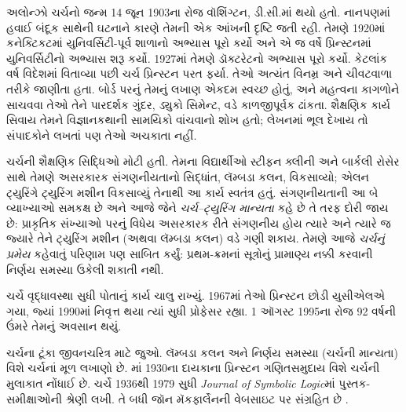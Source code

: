 \begingroup
\makeatletter{}\makeatother


\label{guunit:OLP-0623}



અલોન્ઝો ચર્ચનો જન્મ 14 જૂન 1903ના રોજ
વૉશિંગ્ટન, ડી.સી.માં થયો હતો. નાનપણમાં
હવાઈ બંદૂક સાથેની ઘટનાને કારણે તેમની
એક આંખની દૃષ્ટિ જતી રહી. તેમણે 1920માં
કનેક્ટિકટમાં યુનિવર્સિટી-પૂર્વ શાળાનો અભ્યાસ પૂરો
કર્યો અને એ જ વર્ષે પ્રિન્સ્ટનમાં
યુનિવર્સિટીનો અભ્યાસ શરૂ કર્યો. 1927માં
તેમણે ડૉક્ટરેટનો અભ્યાસ પૂરો કર્યો.
કેટલાંક વર્ષ વિદેશમાં વિતાવ્યા પછી ચર્ચ
પ્રિન્સ્ટન પરત ફર્યા. તેઓ અત્યંત વિનમ્ર
અને ચીવટવાળા તરીકે જાણીતા હતા. બોર્ડ
પરનું તેમનું લખાણ એકદમ સ્વચ્છ હોતું,
અને મહત્વના કાગળોને સાચવવા તેઓ તેને
પારદર્શક ગુંદર, ડ્યુકો સિમેન્ટ, વડે
કાળજીપૂર્વક ઢાંકતા. શૈક્ષણિક કાર્ય
સિવાય તેમને વિજ્ઞાનકથાની સામયિકો
વાંચવાનો શોખ હતો; લેખનમાં ભૂલ દેખાય
તો સંપાદકોને લખતાં પણ તેઓ અચકાતા નહીં.

ચર્ચની શૈક્ષણિક સિદ્ધિઓ મોટી હતી.
તેમના વિદ્યાર્થીઓ સ્ટીફન ક્લીની અને
બાર્કલી રોસેર સાથે તેમણે અસરકારક
સંગણનીયતાનો સિદ્ધાંત, લૅમ્બડા કલન,
વિકસાવ્યો; એલન ટ્યુરિંગે ટ્યુરિંગ
મશીન વિકસાવ્યું તેનાથી આ કાર્ય સ્વતંત્ર
હતું. સંગણનીયતાની આ બે વ્યાખ્યાઓ
સમકક્ષ છે અને આજે જેને
\emph{ચર્ચ--ટ્યુરિંગ માન્યતા} કહે છે
તે તરફ દોરી જાય છે: પ્રાકૃતિક સંખ્યાઓ
પરનું વિધેય અસરકારક રીતે સંગણનીય હોય
ત્યારે અને ત્યારે જ જ્યારે તેને
ટ્યુરિંગ મશીન (અથવા લૅમ્બડા કલન)
વડે ગણી શકાય. તેમણે આજે
\emph{ચર્ચનું પ્રમેય} કહેવાતું પરિણામ
પણ સાબિત કર્યું: પ્રથમ-ક્રમનાં સૂત્રોનું
પ્રામાણ્ય નક્કી કરવાની નિર્ણય સમસ્યા
ઉકેલી શકાતી નથી.

ચર્ચે વૃદ્ધાવસ્થા સુધી પોતાનું કાર્ય
ચાલુ રાખ્યું. 1967માં તેઓ પ્રિન્સ્ટન
છોડી યુસીએલએ ગયા, જ્યાં 1990માં
નિવૃત્ત થયા ત્યાં સુધી પ્રોફેસર રહ્યા.
1 ઑગસ્ટ 1995ના રોજ 92 વર્ષની ઉંમરે
તેમનું અવસાન થયું.

\begin{reading}
ચર્ચના ટૂંકા જીવનચરિત્ર માટે
\citet{EndertonND} જુઓ. લૅમ્બડા કલન
અને નિર્ણય સમસ્યા (ચર્ચની માન્યતા)
વિશે ચર્ચનાં મૂળ લખાણો
\citet{Church1936,Church1936a} છે.
\citet{Aspray1984}માં 1930ના દાયકાના
પ્રિન્સ્ટન ગણિતસમુદાય વિશે ચર્ચની
મુલાકાત નોંધાઈ છે. ચર્ચે 1936થી
1979 સુધી \emph{Journal of
Symbolic Logic}માં પુસ્તક-સમીક્ષાઓની
શ્રેણી લખી. તે બધી જૉન મૅકફાર્લેનની
વેબસાઇટ પર સંગ્રહિત છે
\citep{MacFarlane2015}.
\end{reading}
\endgroup


\begingroup
\makeatletter{}\makeatother

